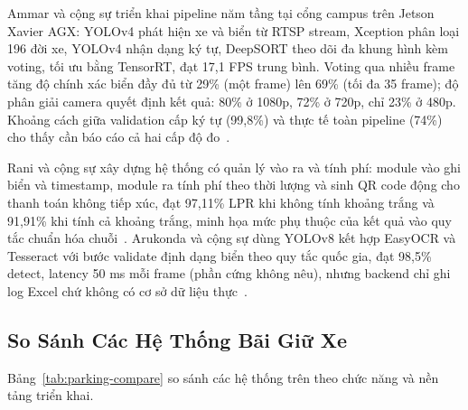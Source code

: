 Ammar và cộng sự triển khai pipeline năm tầng tại cổng campus trên Jetson Xavier AGX:
YOLOv4 phát hiện xe và biển từ RTSP stream, Xception phân loại 196 đời xe, YOLOv4 nhận
dạng ký tự, DeepSORT theo dõi đa khung hình kèm voting, tối ưu bằng TensorRT, đạt 17,1 FPS
trung bình. Voting qua nhiều frame tăng độ chính xác biển đầy đủ từ 29\% (một frame) lên
69\% (tối đa 35 frame); độ phân giải camera quyết định kết quả: 80\% ở 1080p, 72\% ở
720p, chỉ 23\% ở 480p. Khoảng cách giữa validation cấp ký tự (99,8\%) và thực tế toàn
pipeline (74\%) cho thấy cần báo cáo cả hai cấp độ đo~\autocite{ammar2023multistage}.

Rani và cộng sự xây dựng hệ thống có quản lý vào ra và tính phí: module vào ghi biển và
timestamp, module ra tính phí theo thời lượng và sinh QR code động cho thanh toán không
tiếp xúc, đạt 97,11\% LPR khi không tính khoảng trắng và 91,91\% khi tính cả khoảng
trắng, minh họa mức phụ thuộc của kết quả vào quy tắc chuẩn hóa
chuỗi~\autocite{rani2024ips}. Arukonda và cộng sự dùng YOLOv8 kết hợp EasyOCR và Tesseract
với bước validate định dạng biển theo quy tắc quốc gia, đạt 98,5\% detect, latency 50 ms
mỗi frame (phần cứng không nêu), nhưng backend chỉ ghi log Excel chứ không có cơ sở dữ
liệu thực~\autocite{arukonda2026smartparking}.

\subsection{So Sánh Các Hệ Thống Bãi Giữ Xe}

Bảng~\ref{tab:parking-compare} so sánh các hệ thống trên theo chức năng và nền tảng triển
khai.

